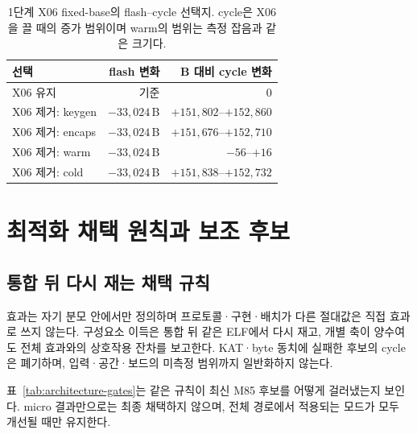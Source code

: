 \documentclass[runningheads,orivec]{llncs}
\begin{document}
\begin{table}[H]\centering\footnotesize
\caption{1단계 X06 fixed-base의 flash--cycle 선택지. cycle은 X06을 끌 때의 증가 범위이며
warm의 범위는 측정 잡음과 같은 크기다.}
\label{tab:x06-pareto}
\renewcommand{\arraystretch}{1.08}
\begin{tabular}{lrr}\toprule
선택 & flash 변화 & B 대비 cycle 변화\\\midrule
X06 유지 & 기준 & 0\\
X06 제거: keygen & $-33,024$\,B & $+151,802$--$+152,860$\\
X06 제거: encaps & $-33,024$\,B & $+151,676$--$+152,710$\\
X06 제거: warm & $-33,024$\,B & $-56$--$+16$\\
X06 제거: cold & $-33,024$\,B & $+151,838$--$+152,732$\\\bottomrule
\end{tabular}
\end{table}
\FloatBarrier

\FloatBarrier
\section{최적화 채택 원칙과 보조 후보}\label{sec:lessons}

\subsection{통합 뒤 다시 재는 채택 규칙}

효과는 자기 분모 안에서만 정의하며 프로토콜·구현·배치가 다른 절대값은 직접 효과로
쓰지 않는다. 구성요소 이득은 통합 뒤 같은 ELF에서 다시 재고, 개별 축이 양수여도
전체 효과와의 상호작용 잔차를 보고한다. KAT·byte 동치에 실패한 후보의 cycle은
폐기하며, 입력·공간·보드의 미측정 범위까지 일반화하지 않는다.

표~\ref{tab:architecture-gates}는 같은 규칙이 최신 M85 후보를 어떻게 걸러냈는지 보인다.
micro 결과만으로는 최종 채택하지 않으며, 전체 경로에서 적용되는 모드가 모두 개선될
때만 유지한다.
\end{document}
